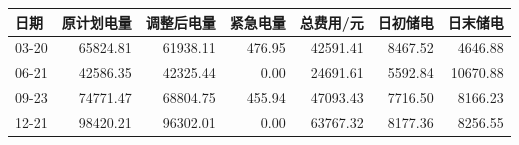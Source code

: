 \begin{tabular}{lrrrrrr}
\toprule
日期 & 原计划电量 & 调整后电量 & 紧急电量 & 总费用/元 & 日初储电 & 日末储电 \\
\midrule
03-20 & 65824.81 & 61938.11 & 476.95 & 42591.41 & 8467.52 & 4646.88 \\
06-21 & 42586.35 & 42325.44 & 0.00 & 24691.61 & 5592.84 & 10670.88 \\
09-23 & 74771.47 & 68804.75 & 455.94 & 47093.43 & 7716.50 & 8166.23 \\
12-21 & 98420.21 & 96302.01 & 0.00 & 63767.32 & 8177.36 & 8256.55 \\
\bottomrule
\end{tabular}